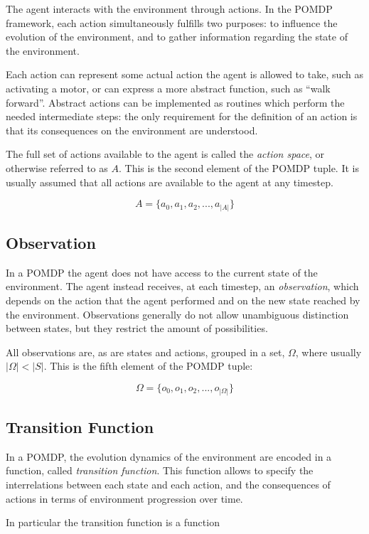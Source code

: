 The agent interacts with the environment through actions. In the POMDP framework, each action
simultaneously fulfills two purposes: to influence the evolution of the environment, and to gather
information regarding the state of the environment.

Each action can represent some actual action the agent is allowed to take, such as activating a
motor, or can express a more abstract function, such as ``walk forward''. Abstract actions can be
implemented as routines which perform the needed intermediate steps: the only requirement for the
definition of an action is that its consequences on the environment are understood.

The full set of actions available to the agent is called the \textit{action space}, or otherwise
referred to as $A$. This is the second element of the POMDP tuple. It is usually assumed that all
actions are available to the agent at any timestep.

\[ A = \{ a_0, a_1, a_2, ..., a_{|A|} \} \]

\subsection{Observation}

In a POMDP the agent does not have access to the current state of the environment. The agent instead
receives, at each timestep, an \textit{observation}, which depends on the action that the agent
performed and on the new state reached by the environment. Observations generally do not allow
unambiguous distinction between states, but they restrict the amount of possibilities.

All observations are, as are states and actions, grouped in a set, $\Omega$, where usually $|\Omega| <
|S|$. This is the fifth element of the POMDP tuple:

\[ \Omega = \{ o_0, o_1, o_2, ..., o_{|\Omega|} \} \]

\subsection{Transition Function}

In a POMDP, the evolution dynamics of the environment are encoded in a function, called
\textit{transition function}. This function allows to specify the interrelations between each state
and each action, and the consequences of actions in terms of environment progression over time.

In particular the transition function is a function


